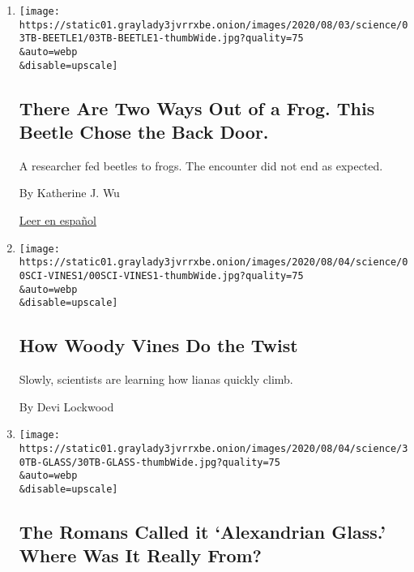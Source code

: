 \begin{enumerate}
\def\labelenumi{\arabic{enumi}.}
\item
  \href{/2020/08/03/science/beetle-frog-poop.html}{}

  \texttt{[image: https://static01.graylady3jvrrxbe.onion/images/2020/08/03/science/03TB-BEETLE1/03TB-BEETLE1-thumbWide.jpg?quality=75\\\&auto=webp\\\&disable=upscale]}

  \hypertarget{there-are-two-ways-out-of-a-frog-this-beetle-chose-the-back-door}{%
  \subsection{There Are Two Ways Out of a Frog. This Beetle Chose the
  Back
  Door.}\label{there-are-two-ways-out-of-a-frog-this-beetle-chose-the-back-door}}

  A researcher fed beetles to frogs. The encounter did not end as
  expected.

  By Katherine J. Wu

  \href{https://www.nytimes3xbfgragh.onion/es/2020/08/04/espanol/ciencia-y-tecnologia/escarabajo-excremento-rana.html}{Leer
  en español}
\item
  \href{/2020/08/01/science/vines-lianas-panama.html}{}

  \texttt{[image: https://static01.graylady3jvrrxbe.onion/images/2020/08/04/science/00SCI-VINES1/00SCI-VINES1-thumbWide.jpg?quality=75\\\&auto=webp\\\&disable=upscale]}

  \hypertarget{how-woody-vines-do-the-twist}{%
  \subsection{How Woody Vines Do the
  Twist}\label{how-woody-vines-do-the-twist}}

  Slowly, scientists are learning how lianas quickly climb.

  By Devi Lockwood
\item
  \href{/2020/07/31/science/alexandrian-glass-rome.html}{}

  \texttt{[image: https://static01.graylady3jvrrxbe.onion/images/2020/08/04/science/30TB-GLASS/30TB-GLASS-thumbWide.jpg?quality=75\\\&auto=webp\\\&disable=upscale]}

  \hypertarget{the-romans-called-it-alexandrian-glass-where-was-it-really-from}{%
  \subsection{The Romans Called it `Alexandrian Glass.' Where Was It
  Really
  From?}\label{the-romans-called-it-alexandrian-glass-where-was-it-really-from}}


\end{enumerate}
